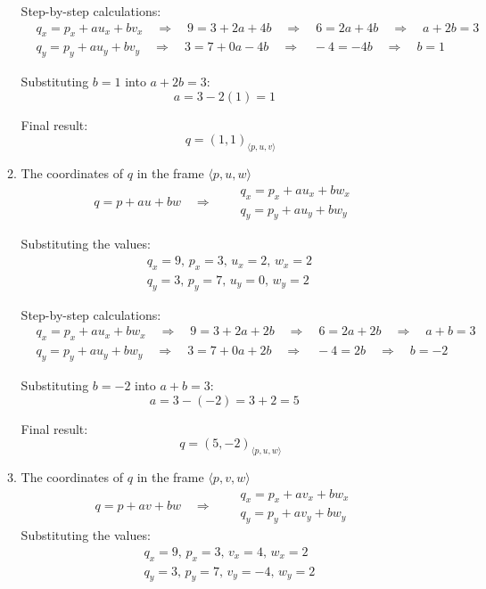 \documentclass{article}
\begin{document}
\begin{enumerate}
\begin{enumerate}
Step-by-step calculations:
\[
\begin{aligned}
    &q_x = p_x + a u_x + b v_x \quad \Rightarrow \quad 9 = 3 + 2a + 4b \quad \Rightarrow \quad 6 = 2a + 4b \quad \Rightarrow \quad a + 2b = 3 \\
    &q_y = p_y + a u_y + b v_y \quad \Rightarrow \quad 3 = 7 + 0a - 4b \quad \Rightarrow \quad -4 = -4b \quad \Rightarrow \quad b = 1
\end{aligned}
\]

Substituting $b = 1$ into $a + 2b = 3$:
\[
a = 3 - 2(1) = 1
\]

Final result:
\[
\quad \boxed{q = (1, 1)_{\langle p, u, v \rangle}}
\]

        
        
      \item The coordinates of $q$ in the frame $\langle p, u, w\rangle$
\[
        q = p + a u + b w \quad \Rightarrow \quad 
        \begin{aligned}
            &q_x = p_x + a u_x + b w_x \\
            &q_y = p_y + a u_y + b w_y
        \end{aligned}
        \]

        Substituting the values:
\[
\begin{aligned}
    &q_x = 9, \, p_x = 3, \, u_x = 2, \, w_x = 2 \\
    &q_y = 3, \, p_y = 7, \, u_y = 0, \, w_y = 2
\end{aligned}
\]

Step-by-step calculations:
\[
\begin{aligned}
    &q_x = p_x + a u_x + b w_x \quad \Rightarrow \quad 9 = 3 + 2a + 2b \quad \Rightarrow \quad 6 = 2a + 2b \quad \Rightarrow \quad a + b = 3 \\
    &q_y = p_y + a u_y + b w_y \quad \Rightarrow \quad 3 = 7 + 0a + 2b \quad \Rightarrow \quad -4 = 2b \quad \Rightarrow \quad b = -2
\end{aligned}
\]

Substituting $b = -2$ into $a + b = 3$:
\[
a = 3 - (-2) = 3 + 2 = 5
\]

Final result:
\[
\quad \boxed{q = (5, -2)_{\langle p, u, w \rangle}}
\]
      \item The coordinates of $q$ in the frame $\langle p, v, w\rangle$
\[
        q = p + a v + b w \quad \Rightarrow \quad 
        \begin{aligned}
            &q_x = p_x + a v_x + b w_x \\
            &q_y = p_y + a v_y + b w_y
        \end{aligned}
        \]
        Substituting the values:
\[
\begin{aligned}
    &q_x = 9, \, p_x = 3, \, v_x = 4, \, w_x = 2\\
    &q_y = 3, \, p_y = 7, \, v_y = -4, \, w_y = 2
\end{aligned}
\]


\end{enumerate}
\end{enumerate}
\end{document}
